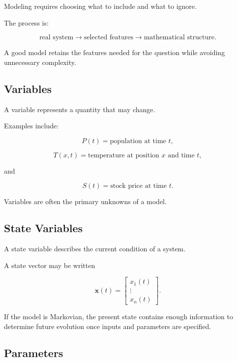 Modeling requires choosing what to include and what to ignore.

The process is:

\[
\boxed{
\text{real system}
\longrightarrow
\text{selected features}
\longrightarrow
\text{mathematical structure}.
}
\]

A good model retains the features needed for the question while avoiding
unnecessary complexity.

\subsection{Variables}
\label{subsec:modeling-variables}

A variable represents a quantity that may change.

Examples include:

\[
\boxed{
P(t)
=
\text{population at time }t,
}
\]

\[
\boxed{
T(x,t)
=
\text{temperature at position }x\text{ and time }t,
}
\]

and

\[
\boxed{
S(t)
=
\text{stock price at time }t.
}
\]

Variables are often the primary unknowns of a model.

\subsection{State Variables}
\label{subsec:state-variables}

A state variable describes the current condition of a system.

A state vector may be written

\[
\boxed{
\mathbf{x}(t)
=
\begin{bmatrix}
x_1(t)\\
\vdots\\
x_n(t)
\end{bmatrix}.
}
\]

If the model is Markovian, the present state contains enough information to
determine future evolution once inputs and parameters are specified.

\subsection{Parameters}
\label{subsec:modeling-parameters}

